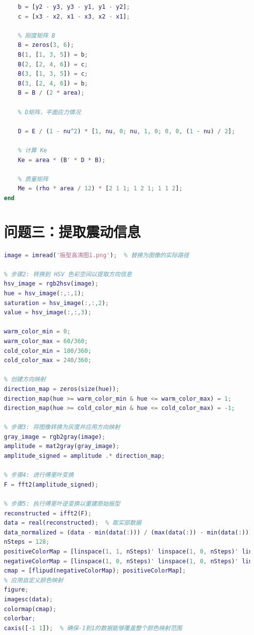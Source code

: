 \documentclass[withoutpreface,bwprint]{cumcmthesis} %
\begin{document}
\begin{appendices}
\begin{lstlisting}[language=matlab]
    % 边向量
    b = [y2 - y3, y3 - y1, y1 - y2];
    c = [x3 - x2, x1 - x3, x2 - x1];

    % 刚度矩阵 B
    B = zeros(3, 6);
    B(1, [1, 3, 5]) = b;
    B(2, [2, 4, 6]) = c;
    B(3, [1, 3, 5]) = c;
    B(3, [2, 4, 6]) = b;
    B = B / (2 * area);

    % D矩阵，平面应力情况

    D = E / (1 - nu^2) * [1, nu, 0; nu, 1, 0; 0, 0, (1 - nu) / 2];

    % 计算 Ke
    Ke = area * (B' * D * B);

    % 质量矩阵
    Me = (rho * area / 12) * [2 1 1; 1 2 1; 1 1 2];
end
\end{lstlisting}

\section{问题三：提取震动信息}
\begin{lstlisting}[language=matlab]
% 步骤1: 读取原始图像
image = imread('振型高清图1.png');  % 替换为图像的实际路径

% 步骤2: 转换到 HSV 色彩空间以提取方向信息
hsv_image = rgb2hsv(image);
hue = hsv_image(:,:,1);
saturation = hsv_image(:,:,2);
value = hsv_image(:,:,3);

warm_color_min = 0;      
warm_color_max = 60/360; 
cold_color_min = 180/360; 
cold_color_max = 240/360; 

% 创建方向映射
direction_map = zeros(size(hue));
direction_map(hue >= warm_color_min & hue <= warm_color_max) = 1;   
direction_map(hue >= cold_color_min & hue <= cold_color_max) = -1;  

% 步骤3: 将图像转换为灰度并应用方向映射
gray_image = rgb2gray(image);
amplitude = mat2gray(gray_image);
amplitude_signed = amplitude .* direction_map;

% 步骤4: 进行傅里叶变换
F = fft2(amplitude_signed);

% 步骤5: 执行傅里叶逆变换以重建原始振型
reconstructed = ifft2(F);
data = real(reconstructed);  % 取实部数据
data_normalized = (data - min(data(:))) / (max(data(:)) - min(data(:)));  % 归一化到0-1
nSteps = 128;  
positiveColorMap = [linspace(1, 1, nSteps)' linspace(1, 0, nSteps)' linspace(1, 0, nSteps)'];
negativeColorMap = [linspace(1, 0, nSteps)' linspace(1, 0, nSteps)' linspace(1, 1, nSteps)'];
cmap = [flipud(negativeColorMap); positiveColorMap];  
% 应用自定义颜色映射
figure;
imagesc(data);  
colormap(cmap);
colorbar;
caxis([-1 1]);  % 确保-1到1的数据能够覆盖整个颜色映射范围





\end{lstlisting}
\end{appendices}
\end{document}
